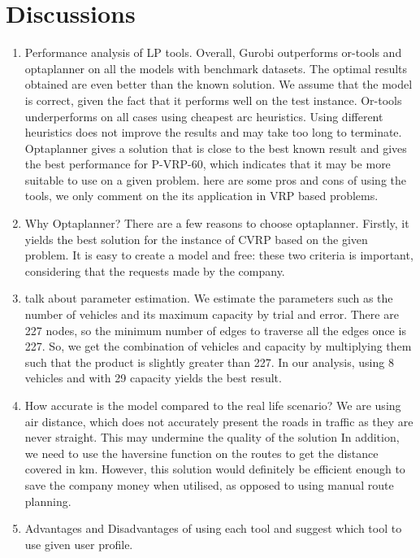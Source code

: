 \section{Discussions}
\begin{enumerate}
\item Performance analysis of LP tools. Overall, Gurobi outperforms or-tools and optaplanner on all the models with
benchmark datasets. The optimal results obtained are even better than the known solution. We assume that the model is
correct, given the fact that it performs well on the test instance.
Or-tools underperforms on all cases using cheapest arc heuristics. Using different heuristics does not
improve the results and may take too long to terminate. Optaplanner gives a solution that is close to the best known result
 and gives the best performance for P-VRP-60, which indicates that it may be more suitable to use on a given problem.
 here are some pros and cons of using the tools, we only comment on the its application in VRP based problems.

\item Why Optaplanner? There are a few reasons to choose optaplanner. Firstly, it yields the best solution for the instance
of CVRP based on the given problem. It is easy to create a model and free: these two criteria is important, considering that
the requests made by the company.

\item talk about parameter estimation. We estimate the parameters such as the number of vehicles and its maximum capacity by trial
and error. There are 227 nodes, so the minimum number of edges to traverse all the edges once is 227. So, we get the combination of vehicles
and capacity by multiplying them such that the product is slightly greater than 227. In our analysis, using 8 vehicles and with 29 capacity
yields the best result.

\item How accurate is the model compared to the real life scenario?
 We are using air distance, which does not accurately present
the roads in traffic as they are never straight. This may undermine the quality of the solution
 In addition, we need to use the haversine function on the routes to get the distance covered in km. However, this solution
 would definitely be efficient enough to save the company money when utilised, as opposed to using manual route planning.

\item Advantages and Disadvantages of using each tool and suggest which tool to use given user profile.
\end{enumerate}

